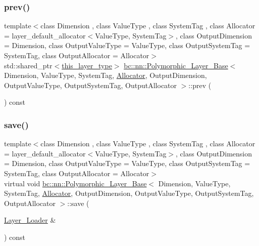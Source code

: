 \subsubsection{\texorpdfstring{prev()}{prev()}\hspace{0.1cm}{\footnotesize\ttfamily [4/4]}}
{\footnotesize\ttfamily template$<$class Dimension , class Value\+Type , class System\+Tag , class Allocator  = layer\+\_\+default\+\_\+allocator$<$\+Value\+Type, System\+Tag$>$, class Output\+Dimension  = Dimension, class Output\+Value\+Type  = Value\+Type, class Output\+System\+Tag  = System\+Tag, class Output\+Allocator  = Allocator$>$ \\
std\+::shared\+\_\+ptr$<$\hyperlink{structbc_1_1nn_1_1Polymorphic__Layer__Base_a6087076d2e0a31e6bbdc2c2039c3ab52}{this\+\_\+layer\+\_\+type}$>$ \hyperlink{structbc_1_1nn_1_1Polymorphic__Layer__Base}{bc\+::nn\+::\+Polymorphic\+\_\+\+Layer\+\_\+\+Base}$<$ Dimension, Value\+Type, System\+Tag, \hyperlink{classbc_1_1allocators_1_1Allocator}{Allocator}, Output\+Dimension, Output\+Value\+Type, Output\+System\+Tag, Output\+Allocator $>$\+::prev (\begin{DoxyParamCaption}{ }\end{DoxyParamCaption}) const\hspace{0.3cm}{\ttfamily [inline]}}

\mbox{\label{structbc_1_1nn_1_1Polymorphic__Layer__Base_aa3a70d0ea45bdd0d9f9932d7fafe3d3e}} 
\subsubsection{\texorpdfstring{save()}{save()}\hspace{0.1cm}{\footnotesize\ttfamily [1/2]}}
{\footnotesize\ttfamily template$<$class Dimension , class Value\+Type , class System\+Tag , class Allocator  = layer\+\_\+default\+\_\+allocator$<$\+Value\+Type, System\+Tag$>$, class Output\+Dimension  = Dimension, class Output\+Value\+Type  = Value\+Type, class Output\+System\+Tag  = System\+Tag, class Output\+Allocator  = Allocator$>$ \\
virtual void \hyperlink{structbc_1_1nn_1_1Polymorphic__Layer__Base}{bc\+::nn\+::\+Polymorphic\+\_\+\+Layer\+\_\+\+Base}$<$ Dimension, Value\+Type, System\+Tag, \hyperlink{classbc_1_1allocators_1_1Allocator}{Allocator}, Output\+Dimension, Output\+Value\+Type, Output\+System\+Tag, Output\+Allocator $>$\+::save (\begin{DoxyParamCaption}\item[{\hyperlink{structbc_1_1nn_1_1Layer__Loader}{Layer\+\_\+\+Loader} \&}]{ }\end{DoxyParamCaption}) const\hspace{0.3cm}{\ttfamily [pure virtual]}}

